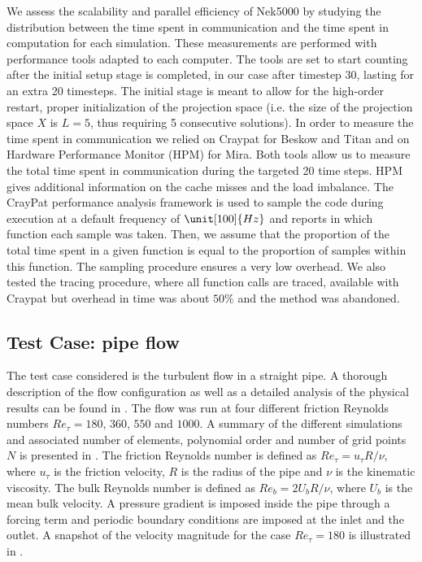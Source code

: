 \documentclass{sig-alternate}
\begin{document}
We assess the scalability and parallel efficiency of Nek5000 by studying the distribution
between the time spent in communication and the time spent in computation for each 
simulation. These measurements are performed with performance tools adapted to each 
computer. The tools are set to start counting after the initial setup stage is 
completed, in our case after timestep 30, lasting for an extra 20 timesteps.  
The initial stage is meant to allow for the high-order restart, proper initialization 
of the projection space (i.e.  the size of the projection space $X$ is $L= 5$, thus
requiring 5 consecutive solutions). In order to measure the time spent in communication 
we relied on Craypat for
Beskow and Titan and on Hardware Performance Monitor (HPM) for Mira. Both tools
allow us to measure the total time spent in communication during the targeted 20 time
steps. HPM gives additional information on the cache misses and the load
imbalance. The CrayPat performance analysis framework is used to sample the code 
during execution at a default frequency of $\unit[100]{Hz}$ and reports in which 
function each sample was taken. Then, we assume that the proportion of the total 
time spent in a given function is equal to the proportion of samples within this 
function. The sampling procedure ensures a very low overhead. We also tested the 
tracing procedure, where all function calls are traced, available with Craypat 
but overhead in time was about $50\%$ and the method was abandoned.

\subsection{Test Case: pipe flow}
\label{sec:pipe}

The test case considered is the turbulent flow in a straight pipe. A thorough 
description of the flow configuration as well as a detailed analysis of the physical 
results can be found in \cite{Khoury2013}. The flow was run at four different 
friction Reynolds numbers $Re_{\tau} = 180$, $360$, $550$ and $1000$. A summary 
of the different simulations and associated number of 
elements, polynomial order and number of grid points $N$ is presented in . 
The friction Reynolds number is defined as $Re_{\tau} = u_{\tau} R / \nu$, where $u_{\tau}$ is 
the friction velocity, $R$ is the radius of the pipe and $\nu$ is the kinematic viscosity. The 
bulk Reynolds number is defined as $Re_{b} = 2 U_b R / \nu$, where $U_b$ is the mean bulk
velocity. A pressure gradient is imposed inside the pipe through a forcing term and periodic 
boundary conditions are imposed at the inlet and the outlet. A snapshot of 
the velocity magnitude for the case $Re_{\tau} = 180$ is illustrated in .
\end{document}
